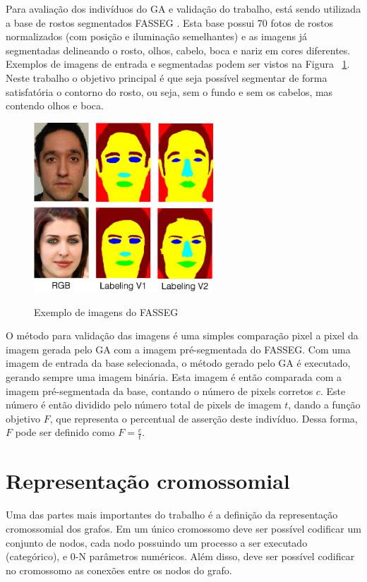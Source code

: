 \documentclass[12pt,oneside,a4paper,english,french,spanish,brazil,]{abntex2}
\begin{document}
Para avaliação dos indivíduos do GA e validação do trabalho, está sendo utilizada a base de rostos segmentados FASSEG \cite{fasseg:2018}. Esta base possui 70 fotos de rostos normalizados (com posição e iluminação semelhantes) e as imagens já segmentadas delineando o rosto, olhos, cabelo, boca e nariz em cores diferentes. Exemplos de imagens de entrada e segmentadas podem ser vistos na Figura ~\ref{fig:FASSEG}. Neste trabalho o objetivo principal é que seja possível segmentar de forma satisfatória o contorno do rosto, ou seja, sem o fundo e sem os cabelos, mas contendo olhos e boca.

\begin{figure}[ht]
\centering
\caption{Exemplo de imagens do FASSEG}
\includegraphics[width=0.6\textwidth]{imagens/FASSEG.png}
\label{fig:FASSEG}
\end{figure}

O método para validação das imagens é uma simples comparação pixel a pixel da imagem gerada pelo GA com a imagem pré-segmentada do FASSEG. Com uma imagem de entrada da base selecionada, o método gerado pelo GA é executado, gerando sempre uma imagem binária. Esta imagem é então comparada com a imagem pré-segmentada da base, contando o número de pixels corretos \(c\). Este número é então dividido pelo número total de pixels de imagem \(t\), dando a função objetivo \(F\), que representa o percentual de asserção deste indivíduo. Dessa forma, \(F\) pode ser definido como \(F = \frac{c}{t}\).

\section{Representação cromossomial}

Uma das partes mais importantes do trabalho é a definição da representação cromossomial dos grafos. Em um único cromossomo deve ser possível codificar um conjunto de nodos, cada nodo possuindo um processo a ser executado (categórico), e 0-N parâmetros numéricos. Além disso, deve ser possível codificar no cromossomo as conexões entre os nodos do grafo.
\end{document}
